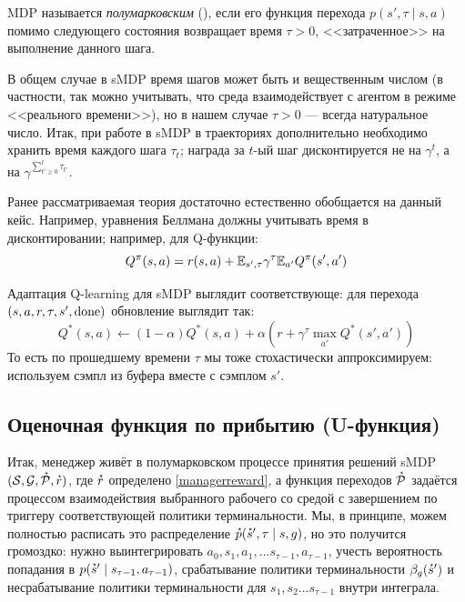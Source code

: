 \begin{definition}
MDP называется \emph{полумарковским} (), если его функция перехода $p(s', \tau \mid s, a)$ помимо следующего состояния возвращает время $\tau > 0$, <<затраченное>> на выполнение данного шага. 
\end{definition}

В общем случае в sMDP время шагов может быть и вещественным числом (в частности, так можно учитывать, что среда взаимодействует с агентом в режиме <<реального времени>>), но в нашем случае $\tau > 0$ --- всегда натуральное число. Итак, при работе в sMDP в траекториях дополнительно необходимо хранить время каждого шага $\tau_t$; награда за $t$-ый шаг дисконтируется не на $\gamma^t$, а на $\gamma^{\sum_{t' \ge 0}^t \tau_{t'}}$.

Ранее рассматриваемая теория достаточно естественно обобщается на данный кейс. Например, уравнения Беллмана должны учитывать время в дисконтировании; например, для Q-функции:
$$Q^\pi(s, a) = r(s, a) + \mathbb{E}_{s', \tau} \gamma^\tau \mathbb{E}_{a'} Q^\pi(s', a')$$

Адаптация Q-learning для sMDP выглядит соответствующе: для перехода $(s, a, r, \tau, s', \mathrm{done})$ обновление выглядит так:
$$Q^*(s, a) \leftarrow (1 - \alpha) Q^*(s, a) + \alpha \left(r + \gamma^\tau \max_{a'} Q^*(s', a') \right)$$
То есть по прошедшему времени $\tau$ мы тоже стохастически аппроксимируем: используем сэмпл из буфера вместе с сэмплом $s'$.

\subsection{Оценочная функция по прибытию (U-функция)}

Итак, менеджер живёт в полумарковском процессе принятия решений sMDP $(\mathcal{S}, \mathcal{G}, \accentset{\star}{\mathcal{P}}, \accentset{\star}{r})$, где $\accentset{\star}{r}$ определено \eqref{managerreward}, а функция переходов $\accentset{\star}{\mathcal{P}}$ задаётся процессом взаимодействия выбранного рабочего со средой с завершением по триггеру соответствующей политики терминальности. Мы, в принципе, можем полностью расписать это распределение $\accentset{\star}{p}(\accentset{\star}{s}', \tau \mid s, g)$, но это получится громоздко: нужно выинтегрировать $a_0, s_1, a_1, \dots s_{\tau - 1}, a_{\tau - 1}$, учесть вероятность попадания в $p(\accentset{\star}{s}' \mid s_{\tau - 1}, a_{\tau - 1})$, срабатывание политики терминальности $\beta_g(\accentset{\star}{s}')$ и несрабатывание политики терминальности для $s_1, s_2 \dots s_{\tau - 1}$ внутри интеграла.

